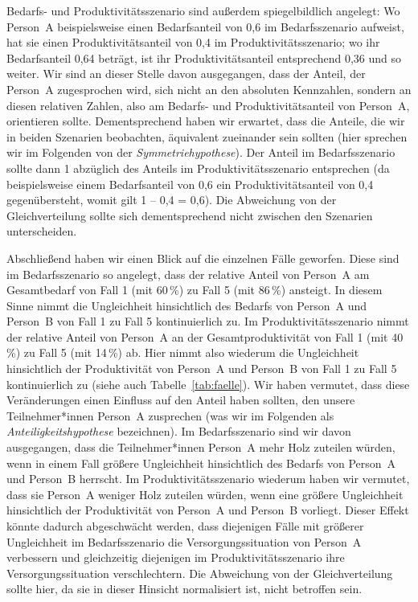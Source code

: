 \documentclass[justified,nobib,nohyper,symmetric,twoside]{tufte-book}
\begin{document}
Bedarfs- und Produktivitätsszenario sind außerdem spiegelbildlich angelegt: Wo Person~A beispielsweise einen Bedarfsanteil von 0,6 im Bedarfsszenario aufweist, hat sie einen Produktivitätsanteil von 0,4 im Produktivitätsszenario; wo ihr Bedarfsanteil 0,64 beträgt, ist ihr Produktivitätsanteil entsprechend 0,36 und so weiter.
Wir sind an dieser Stelle davon ausgegangen, dass der Anteil, der Person~A zugesprochen wird, sich nicht an den absoluten Kennzahlen, sondern an diesen relativen Zahlen, also am Bedarfs- und Produktivitätsanteil von Person~A, orientieren sollte.
Dementsprechend haben wir erwartet, dass die Anteile, die wir in beiden Szenarien beobachten, äquivalent zueinander sein sollten (hier sprechen wir im Folgenden von der \textit{Symmetriehypothese}).
Der Anteil im Bedarfsszenario sollte dann 1 abzüglich des Anteils im Produktivitätsszenario entsprechen (da beispielsweise einem Bedarfsanteil von 0,6 ein Produktivitätsanteil von 0,4 gegenübersteht, womit gilt 1 – 0,4 = 0,6).
Die Abweichung von der Gleichverteilung sollte sich dementsprechend nicht zwischen den Szenarien unterscheiden.

Abschließend haben wir einen Blick auf die einzelnen Fälle geworfen. Diese sind im Bedarfsszenario so angelegt, dass der relative Anteil von Person~A am Gesamtbedarf von Fall 1 (mit 60\,\%) zu Fall 5 (mit 86\,\%) ansteigt.
In diesem Sinne nimmt die Ungleichheit hinsichtlich des Bedarfs von Person~A und Person~B von Fall 1 zu Fall 5 kontinuierlich zu.
Im Produktivitätsszenario nimmt der relative Anteil von Person~A an der Gesamtproduktivität von Fall 1 (mit 40\,\%) zu Fall 5 (mit 14\,\%) ab.
Hier nimmt also wiederum die Ungleichheit hinsichtlich der Produktivität von Person~A und Person~B von Fall 1 zu Fall 5 kontinuierlich zu (siehe auch Tabelle~\ref{tab:faelle}).
Wir haben vermutet, dass diese Veränderungen einen Einfluss auf den Anteil haben sollten, den unsere Teilnehmer*innen Person~A zusprechen (was wir im Folgenden als \textit{Anteiligkeitshypothese} bezeichnen).
Im Bedarfsszenario sind wir davon ausgegangen, dass die Teilnehmer*innen Person~A mehr Holz zuteilen würden, wenn in einem Fall größere Ungleichheit hinsichtlich des Bedarfs von Person~A und Person~B herrscht.
Im Produktivitätsszenario wiederum haben wir vermutet, dass sie Person~A weniger Holz zuteilen würden, wenn eine größere Ungleichheit hinsichtlich der Produktivität von Person~A und Person~B vorliegt.
Dieser Effekt könnte dadurch abgeschwächt werden, dass diejenigen Fälle mit größerer Ungleichheit im Bedarfsszenario die Versorgungssituation von Person~A verbessern und gleichzeitig diejenigen im Produktivitätsszenario ihre Versorgungssituation verschlechtern.
Die Abweichung von der Gleichverteilung sollte hier, da sie in dieser Hinsicht normalisiert ist, nicht betroffen sein.
\end{document}
